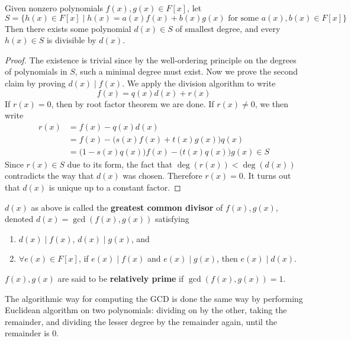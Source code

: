   \begin{theorem}
    Given nonzero polynomials $f(x), g(x) \in F[x]$, let 
    \begin{equation}
      S = \{h(x) \in F[x] \mid h(x) = a(x) f(x) + b(x) g(x) \text{ for some } a(x), b(x) \in F[x] \}
    \end{equation} 
    Then there exists some polynomial $d(x) \in S$ of smallest degree, and every $h(x) \in S$ is divisible by $d(x)$. 
  \end{theorem}
  \begin{proof}
    The existence is trivial since by the well-ordering principle on the degrees of polynomials in $S$, such a minimal degree must exist. Now we prove the second claim by proving $d(x) \mid f(x)$. We apply the division algorithm to write 
    \begin{equation}
      f(x) = q(x) d(x) + r(x)
    \end{equation}
    If $r(x) = 0$, then by root factor theorem we are done. If $r(x) \neq 0$, we then write 
    \begin{align}
      r(x) & = f(x) - q(x) d(x) \\ 
           & = f(x) - \big( s(x) f(x) + t(x) g(x) \big) q(x) \\ 
           & = \big( 1 - s(x) q(x) \big) f(x) - \big( t(x) q(x) \big) g(x) \in S
    \end{align}
    Since $r(x) \in S$ due to its form, the fact that $\deg(r(x)) < \deg(d(x))$ contradicts the way that $d(x)$ was chosen. Therefore $r(x) = 0$. It turns out that $d(x)$ is unique up to a constant factor. 
  \end{proof}

  \begin{definition}[GCD]
    $d(x)$ as above is called the \textbf{greatest common divisor} of $f(x), g(x)$, denoted $d(x) = \gcd(f(x), g(x))$ satisfying 
    \begin{enumerate}
      \item $d(x) \mid f(x)$, $d(x) \mid g(x)$, and 
      \item $\forall e(x) \in F[x]$, if $e(x) \mid f(x)$ and $e(x) \mid g(x)$, then $e(x) \mid d(x)$. 
    \end{enumerate}
    $f(x), g(x)$ are said to be \textbf{relatively prime} if $\gcd(f(x), g(x)) = 1$. 
  \end{definition}

  The algorithmic way for computing the GCD is done the same way by performing Euclidean algorithm on two polynomials: dividing on by the other, taking the remainder, and dividing the lesser degree by the remainder again, until the remainder is $0$. 


